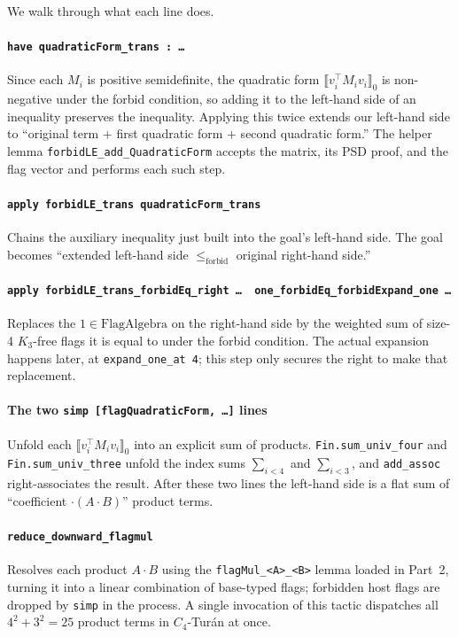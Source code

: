 \documentclass[11pt]{article}
\begin{document}
We walk through what each line does.

\paragraph{\texttt{have quadraticForm\_trans : \ldots}}
Since each $M_i$ is positive semidefinite, the quadratic form
$\llbracket v_i^\top M_i v_i \rrbracket_0$ is non-negative under the
forbid condition, so adding it to the left-hand side of an inequality
preserves the inequality. Applying this twice extends our left-hand side
to ``original term $+$ first quadratic form $+$ second quadratic form.''
The helper lemma \texttt{forbidLE\_add\_QuadraticForm} accepts the matrix,
its PSD proof, and the flag vector and performs each such step.

\paragraph{\texttt{apply forbidLE\_trans quadraticForm\_trans}}
Chains the auxiliary inequality just built into the goal's left-hand side.
The goal becomes ``extended left-hand side
$\le_{\text{forbid}}$ original right-hand side.''

\paragraph{\texttt{apply forbidLE\_trans\_forbidEq\_right \ldots\,
one\_forbidEq\_forbidExpand\_one \ldots}}
Replaces the $1 \in \mathrm{FlagAlgebra}$ on the right-hand side by the
weighted sum of size-4 $K_3$-free flags it is equal to under the forbid
condition. The actual expansion happens later, at \texttt{expand\_one\_at
4}; this step only secures the right to make that replacement.

\paragraph{The two \texttt{simp [flagQuadraticForm, \ldots]} lines}
Unfold each $\llbracket v_i^\top M_i v_i \rrbracket_0$ into an explicit sum
of products. \texttt{Fin.sum\_univ\_four} and
\texttt{Fin.sum\_univ\_three} unfold the index sums $\sum_{i<4}$ and
$\sum_{i<3}$, and \texttt{add\_assoc} right-associates the result. After
these two lines the left-hand side is a flat sum of
``coefficient $\cdot (A \cdot B)$'' product terms.

\paragraph{\texttt{reduce\_downward\_flagmul}}
Resolves each product $A \cdot B$ using the
\texttt{flagMul\_<A>\_<B>} lemma loaded in Part~2, turning it into a
linear combination of base-typed flags; forbidden host flags are dropped by
\texttt{simp} in the process. A single invocation of this tactic dispatches
all $4^2 + 3^2 = 25$ product terms in $C_4$-Tur\'an at once.
\end{document}
